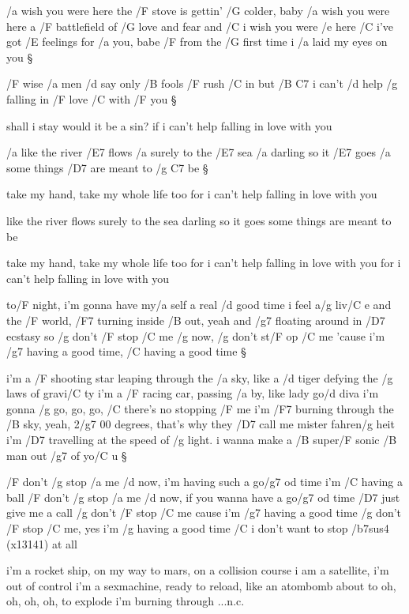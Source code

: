 /a wish you were here
the /F stove is gettin' /G colder, baby
/a wish you were here
a /F battlefield of /G love and fear
and /C i wish you were /e here
/C i've got /E feelings for /a you, babe
/F from the /G first time i /a laid my eyes on you \S

\rr




/F wise /a men /d say only /B fools /F rush /C in
but /{B C7} i can't /d help /g falling in /F love /C with /F you \S

shall i stay would it be a sin?
if i can't help falling in love with you \s

/a like the river /E7 flows
/a surely to the /E7 sea
/a darling so it /E7 goes
/a some things /D7 are meant to /{g C7} be \S

take my hand, take my whole life too
for i can't help falling in love with you \s

like the river flows
surely to the sea
darling so it goes
some things are meant to be \s

take my hand, take my whole life too
for i can't help falling in love with you
for i can't help falling in love with you



to/F night, i'm gonna have my/a self a real /d good time i feel a/g liv/C e
and the /F world, /F7 turning inside /B out, yeah
and /g7 floating around in /D7 ecstasy
so /g don't /F stop /C me /g now, /g don't st/F op /C me
'cause i'm /g7 having a good time, /C having a good time \S

i'm a /F shooting star leaping through the /a sky, like a /d tiger
defying the /g laws of gravi/C ty
i'm a /F racing car, passing /a by, like lady go/d diva
i'm gonna /g go, go, go, /C there's no stopping /F me
i'm /F7 burning through the /B sky, yeah, 2/g7 00 degrees,
that's why they /D7 call me mister fahren/g heit
i'm /D7 travelling at the speed of /g light.
i wanna make a /B super/F sonic /B man out /g7 of yo/C u \S

/F don't /g stop /a me /d now, i'm having such a go/g7 od time
i'm /C having a ball
/F don't /g stop /a me /d now, if you wanna have a go/g7 od time
/D7 just give me a call
/g don't /F stop /C me cause i'm /g7 having a good time
/g don't /F stop /C me, yes i'm /g having a good time
/C i don't want to stop /{b7sus4 (x13141)} at all \songgg


i'm a rocket ship, on my way to mars, on a collision course
i am a satellite, i'm out of control
i'm a sexmachine, ready to reload, like an atombomb
about to oh, oh, oh, oh, to explode
i'm burning through ...n.c. \s

